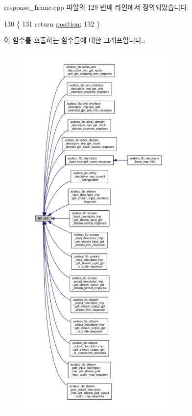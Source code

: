 response\+\_\+frame.\+cpp 파일의 129 번째 라인에서 정의되었습니다.


\begin{DoxyCode}
130 \{
131     \textcolor{keywordflow}{return} \hyperlink{classavdecc__lib_1_1response__frame_a7a04afe5347934be732ec70a70bd0a28}{position};
132 \}
\end{DoxyCode}


이 함수를 호출하는 함수들에 대한 그래프입니다.\+:
\nopagebreak
\begin{figure}[H]
\begin{center}
\leavevmode
\includegraphics[height=550pt]{classavdecc__lib_1_1response__frame_a4038092b7b420000faefc768241adb42_icgraph}
\end{center}
\end{figure}


